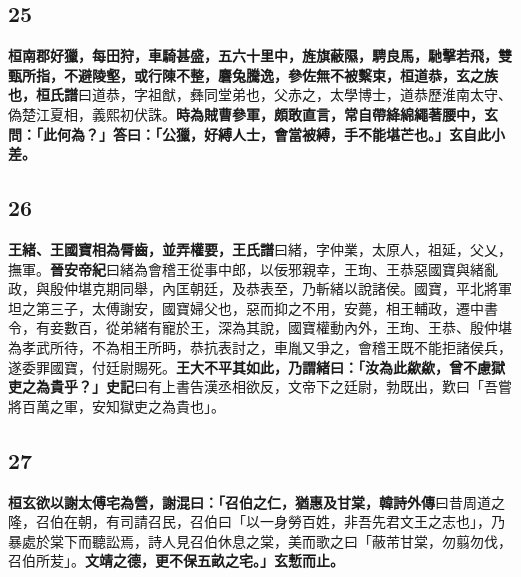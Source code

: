 \subsection*{25}

\textbf{桓南郡好獵，每田狩，車騎甚盛，五六十里中，旌旗蔽隰，騁良馬，馳擊若飛，雙甄所指，不避陵壑，或行陳不整，麏兔騰逸，參佐無不被繫束，桓道恭，玄之族也，}{\footnotesize \textbf{桓氏譜}曰道恭，字祖猷，彝同堂弟也，父赤之，太學博士，道恭歷淮南太守、偽楚江夏相，義熙初伏誅。}\textbf{時為賊曹參軍，頗敢直言，常自帶絳綿繩著腰中，玄問：「此何為？」答曰：「公獵，好縛人士，會當被縛，手不能堪芒也。」玄自此小差。}

\subsection*{26}

\textbf{王緒、王國寶相為脣齒，並弄權要，}{\footnotesize \textbf{王氏譜}曰緒，字仲業，太原人，祖延，父乂，撫軍。\textbf{晉安帝紀}曰緒為會稽王從事中郎，以佞邪親幸，王珣、王恭惡國寶與緒亂政，與殷仲堪克期同舉，內匡朝廷，及恭表至，乃斬緒以說諸侯。國寶，平北將軍坦之第三子，太傅謝安，國寶婦父也，惡而抑之不用，安薨，相王輔政，遷中書令，有妾數百，從弟緒有寵於王，深為其說，國寶權動內外，王珣、王恭、殷仲堪為孝武所待，不為相王所眄，恭抗表討之，車胤又爭之，會稽王既不能拒諸侯兵，遂委罪國寶，付廷尉賜死。}\textbf{王大不平其如此，乃謂緒曰：「汝為此歘歘，曾不慮獄吏之為貴乎？」}{\footnotesize \textbf{史記}曰有上書告漢丞相欲反，文帝下之廷尉，勃既出，歎曰「吾嘗將百萬之軍，安知獄吏之為貴也」。}

\subsection*{27}

\textbf{桓玄欲以謝太傅宅為營，謝混曰：「召伯之仁，猶惠及甘棠，}{\footnotesize \textbf{韓詩外傳}曰昔周道之隆，召伯在朝，有司請召民，召伯曰「以一身勞百姓，非吾先君文王之志也」，乃暴處於棠下而聽訟焉，詩人見召伯休息之棠，美而歌之曰「蔽芾甘棠，勿翦勿伐，召伯所苃」。}\textbf{文靖之德，更不保五畝之宅。」玄慙而止。}